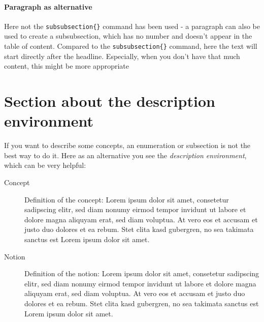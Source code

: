 \paragraph{Paragraph as alternative} %
\label{par:paragraph_as_alternative}
Here not the \texttt{subsubsection\{\}} command has been used - a paragraph can also be used to create a subsubsection, which has no number and doesn't appear in the table of content. Compared to the \texttt{subsubsection\{\}} command, here the text will start directly after the headline. Especially, when you don't have that much content, this might be more appropriate 






\section{Section about the description environment} %
\label{sec:section_about_the_description_environment}

If you want to describe some concepts, an enumeration or subsection is not the best way to do it. Here as an alternative you see the \emph{description environment}, which can be very helpful:

\begin{description}
	\item[Concept] Definition of the concept: Lorem ipsum dolor sit amet, consetetur sadipscing elitr, sed diam nonumy eirmod tempor invidunt ut labore et dolore magna aliquyam erat, sed diam voluptua. At vero eos et accusam et justo duo dolores et ea rebum. Stet clita kasd gubergren, no sea takimata sanctus est Lorem ipsum dolor sit amet.
	\item[Notion] Definition of the notion: Lorem ipsum dolor sit amet, consetetur sadipscing elitr, sed diam nonumy eirmod tempor invidunt ut labore et dolore magna aliquyam erat, sed diam voluptua. At vero eos et accusam et justo duo dolores et ea rebum. Stet clita kasd gubergren, no sea takimata sanctus est Lorem ipsum dolor sit amet.
\end{description}



